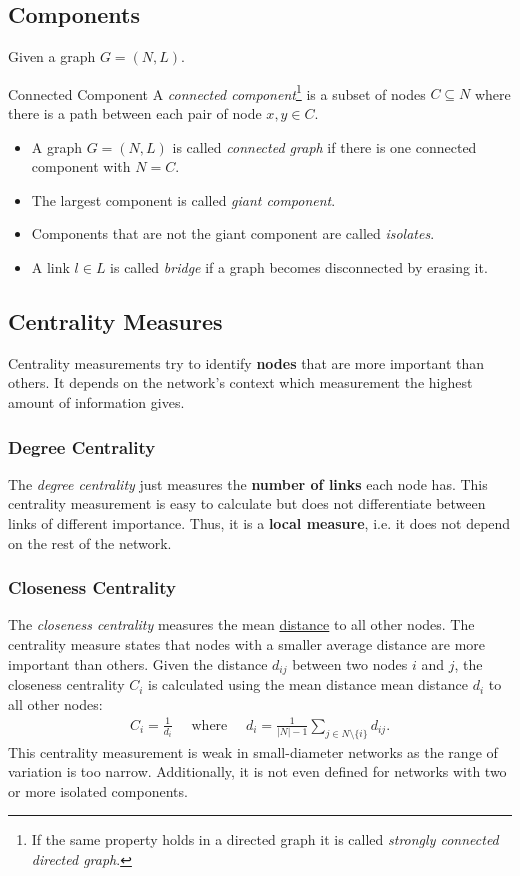 \documentclass[english]{panikzettel}
\begin{document}
\subsection{Components}\label{sec:components}
Given a graph $ G = (N,L) $.

\begin{defi}{Connected Component}
	A \emph{connected component}\footnote{If the same property holds in a directed graph it is called \emph{strongly connected directed graph}.} is a subset of nodes $ C \subseteq N $ where there is a path between each pair of node $ x,y \in C $.

	\begin{itemize}
		\item A graph $ G = (N,L) $ is called \emph{connected graph} if there is one connected component with $ N = C $.
		\item The largest component is called \emph{giant component}.
		\item Components that are not the giant component are called \emph{isolates}.
		\item A link $ l \in L $ is called \emph{bridge} if a graph becomes disconnected by erasing it.
	\end{itemize}
\end{defi}

\subsection{Centrality Measures}
Centrality measurements try to identify \textbf{nodes} that are more important than others.
It depends on the network's context which measurement the highest amount of information gives.

\subsubsection{Degree Centrality}
The \emph{degree centrality} just measures the \textbf{number of links} each node has.
This centrality measurement is easy to calculate but does not differentiate between links of different importance.
Thus, it is a \textbf{local measure}, i.e. it does not depend on the rest of the network.

\subsubsection{Closeness Centrality}
The \emph{closeness centrality} measures the mean \hyperref[sec:distance]{distance} to all other nodes.
The centrality measure states that nodes with a smaller average distance are more important than others.
Given the distance $d_{ij}$ between two nodes $i$ and $j$, the closeness centrality $C_i$ is calculated using the mean distance mean distance $d_i$ to all other nodes:
\begin{align*}
	C_i = \frac{1}{d_i} \quad\text{ where }\quad d_i = \frac{1}{|N| - 1} \sum\limits_{j \in N \setminus \{i\}} d_{ij}.
\end{align*}
This centrality measurement is weak in small-diameter networks as the range of variation is too narrow.
Additionally, it is not even defined for networks with two or more isolated components.
\end{document}

